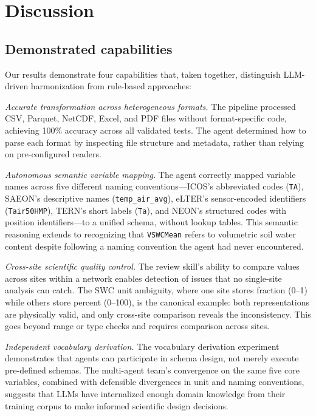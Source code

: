 \documentclass[review,authoryear]{elsarticle}
\begin{document}
\section{Discussion}
\label{sec:discussion}

\subsection{Demonstrated capabilities}
\label{sec:ai-can}

Our results demonstrate four capabilities that, taken together, distinguish LLM-driven harmonization from rule-based approaches:

\textit{Accurate transformation across heterogeneous formats.} The pipeline processed CSV, Parquet, NetCDF, Excel, and PDF files without format-specific code, achieving 100\% accuracy across all validated tests. The agent determined how to parse each format by inspecting file structure and metadata, rather than relying on pre-configured readers.

\textit{Autonomous semantic variable mapping.} The agent correctly mapped variable names across five different naming conventions---ICOS's abbreviated codes (\texttt{TA}), SAEON's descriptive names (\texttt{temp\_air\_avg}), eLTER's sensor-encoded identifiers (\texttt{Tair50HMP}), TERN's short labels (\texttt{Ta}), and NEON's structured codes with position identifiers---to a unified schema, without lookup tables. This semantic reasoning extends to recognizing that \texttt{VSWCMean} refers to volumetric soil water content despite following a naming convention the agent had never encountered.

\textit{Cross-site scientific quality control.} The review skill's ability to compare values across sites within a network enables detection of issues that no single-site analysis can catch. The SWC unit ambiguity, where one site stores fraction (0--1) while others store percent (0--100), is the canonical example: both representations are physically valid, and only cross-site comparison reveals the inconsistency. This goes beyond range or type checks and requires comparison across sites.

\textit{Independent vocabulary derivation.} The vocabulary derivation experiment demonstrates that agents can participate in schema design, not merely execute pre-defined schemas. The multi-agent team's convergence on the same five core variables, combined with defensible divergences in unit and naming conventions, suggests that LLMs have internalized enough domain knowledge from their training corpus to make informed scientific design decisions.
\end{document}
